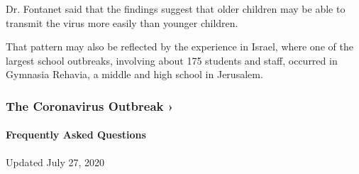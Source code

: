 Dr. Fontanet said that the findings suggest that older children may be
able to transmit the virus more easily than younger children.

That pattern may also be reflected by the experience in Israel, where
one of the largest school outbreaks, involving about 175 students and
staff, occurred in Gymnasia Rehavia, a middle and high school in
Jerusalem.

\href{https://www.nytimes.com/news-event/coronavirus?action=click\&pgtype=Article\&state=default\&region=MAIN_CONTENT_3\&context=storylines_faq}{}

\hypertarget{the-coronavirus-outbreak-}{%
\subsubsection{The Coronavirus Outbreak
›}\label{the-coronavirus-outbreak-}}

\hypertarget{frequently-asked-questions}{%
\paragraph{Frequently Asked
Questions}\label{frequently-asked-questions}}

Updated July 27, 2020


